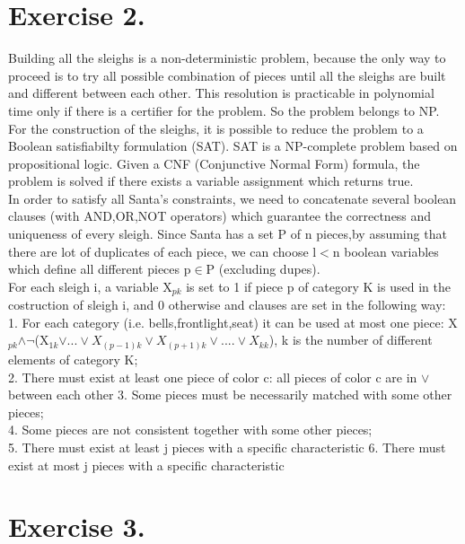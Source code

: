 \documentclass[11pt]{scrartcl}
\begin{document}
\section{Exercise 2.}
Building all the sleighs is a non-deterministic problem, because the only way to proceed is to try all possible combination of pieces until all the sleighs are built and different between each other. This resolution is practicable in polynomial time only if there is a certifier for the problem. So the problem belongs to NP.
For the construction of the sleighs, it is possible to reduce the problem to a Boolean satisfiabilty formulation (SAT). SAT is a NP-complete problem based on propositional logic. Given a CNF (Conjunctive Normal Form) formula, the problem is solved if there exists a variable assignment which returns true.\\
In order to satisfy all Santa's constraints, we need to concatenate several boolean clauses (with AND,OR,NOT operators) which guarantee the correctness and uniqueness of every sleigh. 
Since Santa has a set P of n pieces,by assuming that there are lot of duplicates of each piece, we can choose l$<$n boolean variables which define all different pieces p$\in$P (excluding dupes).\\For each sleigh i, a variable X$_{pk}$ is set to 1 if piece p of category K is used in the costruction of sleigh i, and 0 otherwise and clauses are set in the following way:\\
1. For each category (i.e. bells,frontlight,seat) it can be used at most one piece:
X$_{pk}$$\wedge$$\neg$(X$_{1k}$$\vee...\vee X_{(p-1)k} \vee X_{(p+1)k} \vee....\vee X_{kk}$), k is the number of different elements of category K;\\
2. There must exist at least one piece of color c: all pieces of color c are in $\vee$ between each other
3. Some pieces must be necessarily matched with some other pieces;\\
4. Some pieces are not consistent together with some other pieces;\\
5. There must exist at least j pieces with a specific characteristic
6. There must exist at most j pieces with a specific characteristic
\newpage
\section{Exercise 3.}
\end{document}
